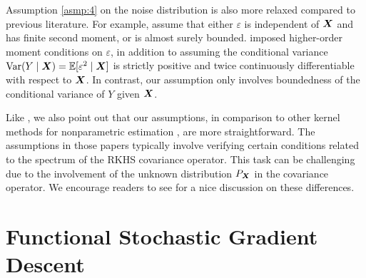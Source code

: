 Assumption \ref{asmp:4} on the noise distribution is also more relaxed compared to previous literature. For example, \cite{zhang2022sieve} assume that either $\varepsilon$ is independent of $\bm{X}$ and has finite second moment, or is almost surely bounded. \cite{doi:10.1080/01621459.2023.2182213} imposed higher-order moment conditions on $\varepsilon$, in addition to assuming the conditional variance $\text{Var}(Y \mid \bm{X}) = \mathbb{E}[\varepsilon^2 \mid \bm{X}]$ is strictly positive and twice continuously differentiable with respect to $\bm{X}$. In contrast, our assumption only involves boundedness of the conditional variance of $Y$ given $\bm{X}$.

Like \cite{zhang2022sieve}, we also point out that our assumptions,  in comparison to other kernel methods for nonparametric estimation \citep{4406a3ce-1e59-3ed8-8c25-9f7d75b81f14, 6842642,article}, are more straightforward. The assumptions in those papers typically involve verifying certain conditions related to the spectrum of the RKHS covariance operator. This task can be challenging due to the involvement of the unknown distribution $P_{\bm{X}}$ in the covariance operator. We encourage readers to see \cite{zhang2022sieve} for a nice discussion on these differences. 



\section{Functional Stochastic Gradient Descent}\label{subsec:F-SGD}

